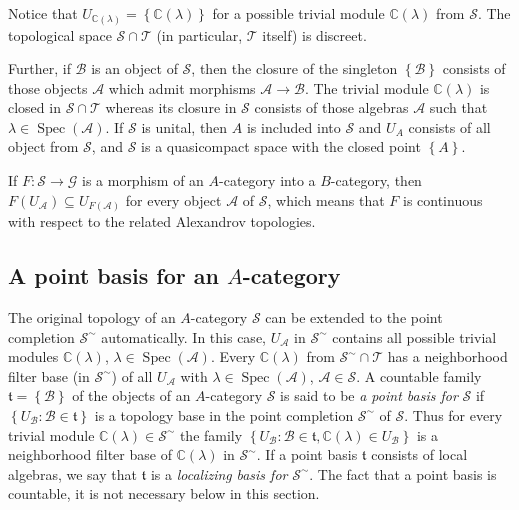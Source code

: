 \documentclass[12pt]{amsart}%
\theoremstyle{plain}
\numberwithin{equation}{section}
\numberwithin{equation}{section}
\numberwithin{theorem}{section}
\numberwithin{lemma}{section}
\numberwithin{remark}{section}
\numberwithin{example}{section}
\numberwithin{proposition}{section}
\numberwithin{definition}{section}
\numberwithin{corollary}{section}
\begin{document}
Notice that $U_{\mathbb{C}\left(  \lambda\right)  }=\left\{  \mathbb{C}\left(
\lambda\right)  \right\}  $ for a possible trivial module $\mathbb{C}\left(
\lambda\right)  $ from $\mathcal{S}$. The topological space $\mathcal{S\cap
T}$ (in particular, $\mathcal{T}$ itself) is discreet.

Further, if $\mathcal{B}$ is an object of $\mathcal{S}$, then the closure of
the singleton $\left\{  \mathcal{B}\right\}  $ consists of those objects
$\mathcal{A}$ which admit morphisms $\mathcal{A\rightarrow B}$. The trivial
module $\mathbb{C}\left(  \lambda\right)  $ is closed in $\mathcal{S\cap T}$
whereas its closure in $\mathcal{S}$ consists of those algebras $\mathcal{A}$
such that $\lambda\in\operatorname{Spec}\left(  \mathcal{A}\right)  $. If
$\mathcal{S}$ is unital, then $A$ is included into $\mathcal{S}$ and $U_{A}$
consists of all object from $\mathcal{S}$, and $\mathcal{S}$ is a quasicompact
space with the closed point $\left\{  A\right\}  $.

If $F:\mathcal{S\rightarrow G}$ is a morphism of an $A$-category into a
$B$-category, then $F\left(  U_{\mathcal{A}}\right)  \subseteq U_{F\left(
\mathcal{A}\right)  }$ for every object $\mathcal{A}$ of $\mathcal{S}$, which
means that $F$ is continuous with respect to the related Alexandrov topologies.

\subsection{A point basis for an $A$-category\label{subsecPB}}

The original topology of an $A$-category $\mathcal{S}$ can be extended to the
point completion $\mathcal{S}^{\sim}$ automatically. In this case,
$U_{\mathcal{A}}$ in $\mathcal{S}^{\sim}$ contains all possible trivial
modules $\mathbb{C}\left(  \lambda\right)  $, $\lambda\in\operatorname{Spec}%
\left(  \mathcal{A}\right)  $. Every $\mathbb{C}\left(  \lambda\right)  $ from
$\mathcal{S}^{\sim}\cap\mathcal{T}$ has a neighborhood filter base (in
$\mathcal{S}^{\sim}$) of all $U_{\mathcal{A}}$ with $\lambda\in
\operatorname{Spec}\left(  \mathcal{A}\right)  $, $\mathcal{A\in S}$. A
countable family $\mathfrak{t=}\left\{  \mathcal{B}\right\}  $ of the objects
of an $A$-category $\mathcal{S}$ is said to be \textit{a point basis for
}$\mathcal{S}$ if $\left\{  U_{\mathcal{B}}:\mathcal{B}\in\mathfrak{t}%
\right\}  $ is a topology base in the point completion $\mathcal{S}^{\sim}$ of
$\mathcal{S}$. Thus for every trivial module $\mathbb{C}\left(  \lambda
\right)  \in\mathcal{S}^{\sim}$ the family $\left\{  U_{\mathcal{B}%
}:\mathcal{B}\in\mathfrak{t},\mathbb{C}\left(  \lambda\right)  \in
U_{\mathcal{B}}\right\}  $ is a neighborhood filter base of $\mathbb{C}\left(
\lambda\right)  $ in $\mathcal{S}^{\sim}$. If a point basis $\mathfrak{t}$
consists of local algebras, we say that $\mathfrak{t}$ is a
\textit{localizing} \textit{basis for }$\mathcal{S}^{\sim}$. The fact that a
point basis is countable, it is not necessary below in this section.
\end{document}
